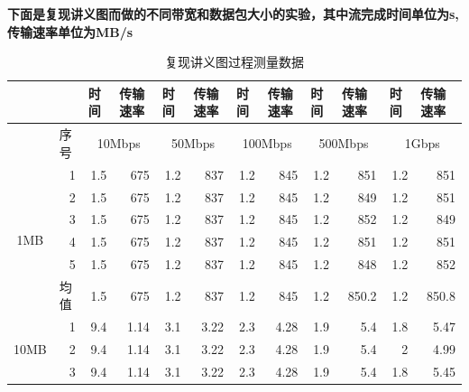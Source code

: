 \documentclass[11pt]{article}
\begin{document}
\newpage



\textbf{下面是复现讲义图而做的不同带宽和数据包大小的实验，其中流完成时间单位为s, 传输速率单位为MB/s}
\begin{table}[htbp]
  \centering
  \caption{复现讲义图过程测量数据}
    \begin{tabular}{|c|l|r|r|r|r|r|r|r|r|r|r|}
    \hline
          &       & \multicolumn{1}{l|}{时间} & \multicolumn{1}{l|}{传输速率} & \multicolumn{1}{l|}{时间} & \multicolumn{1}{l|}{传输速率} & \multicolumn{1}{l|}{时间} & \multicolumn{1}{l|}{传输速率} & \multicolumn{1}{l|}{时间} & \multicolumn{1}{l|}{传输速率} & \multicolumn{1}{l|}{时间} & \multicolumn{1}{l|}{传输速率} \bigstrut\\
    \hline
          & 序号    & \multicolumn{2}{c|}{10Mbps} & \multicolumn{2}{c|}{50Mbps} & \multicolumn{2}{c|}{100Mbps} & \multicolumn{2}{c|}{500Mbps} & \multicolumn{2}{c|}{1Gbps} \bigstrut\\
    \hline
    \multirow{6}[12]{*}{1MB} & \multicolumn{1}{r|}{1} & 1.5   & 675   & 1.2   & 837   & 1.2   & 845   & 1.2   & 851   & 1.2   & 851 \bigstrut\\
\cline{2-12}          & \multicolumn{1}{r|}{2} & 1.5   & 675   & 1.2   & 837   & 1.2   & 845   & 1.2   & 849   & 1.2   & 851 \bigstrut\\
\cline{2-12}          & \multicolumn{1}{r|}{3} & 1.5   & 675   & 1.2   & 837   & 1.2   & 845   & 1.2   & 852   & 1.2   & 849 \bigstrut\\
\cline{2-12}          & \multicolumn{1}{r|}{4} & 1.5   & 675   & 1.2   & 837   & 1.2   & 845   & 1.2   & 851   & 1.2   & 851 \bigstrut\\
\cline{2-12}          & \multicolumn{1}{r|}{5} & 1.5   & 675   & 1.2   & 837   & 1.2   & 845   & 1.2   & 848   & 1.2   & 852 \bigstrut\\
\cline{2-12}          & 均值    & 1.5   & 675   & 1.2   & 837   & 1.2   & 845   & 1.2   & 850.2 & 1.2   & 850.8 \bigstrut\\
    \hline
    \multirow{6}[12]{*}{10MB} & \multicolumn{1}{r|}{1} & 9.4   & 1.14  & 3.1   & 3.22  & 2.3   & 4.28  & 1.9   & 5.4   & 1.8   & 5.47 \bigstrut\\
\cline{2-12}          & \multicolumn{1}{r|}{2} & 9.4   & 1.14  & 3.1   & 3.22  & 2.3   & 4.28  & 1.9   & 5.4   & 2     & 4.99 \bigstrut\\
\cline{2-12}          & \multicolumn{1}{r|}{3} & 9.4   & 1.14  & 3.1   & 3.22  & 2.3   & 4.28  & 1.9   & 5.4   & 1.8   & 5.45 \bigstrut\\

\end{tabular}
\end{table}
\end{document}
